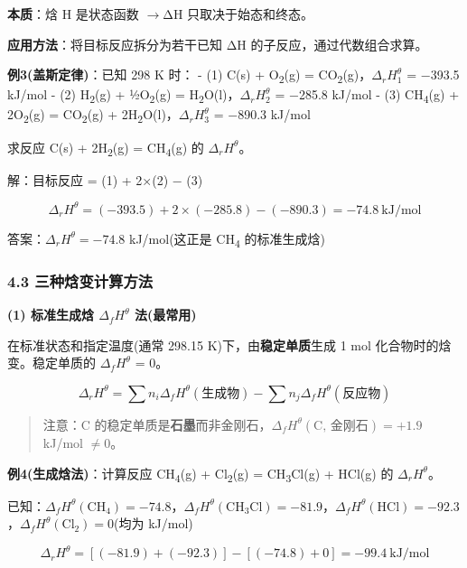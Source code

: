 \documentclass[a4paper,11pt]{ctexart}
\newcommand{\箭}{\ensuremath{\rightarrow}}
\newcommand{\左箭}{\ensuremath{\leftarrow}}
\newcommand{\上箭}{\ensuremath{\uparrow}}
\newcommand{\下箭}{\ensuremath{\downarrow}}
\newcommand{\衡}{\ensuremath{\rightleftharpoons}}
\newcommand{\双箭}{\ensuremath{\leftrightarrow}}
\newcommand{\约等于}{\ensuremath{\approx}}
\newcommand{\小于等于}{\ensuremath{\leq}}
\newcommand{\大于等于}{\ensuremath{\geq}}
\newcommand{\不等于}{\ensuremath{\neq}}
\newcommand{\西格马}{\ensuremath{\sigma}}
\newcommand{\派}{\ensuremath{\pi}}
\begin{document}
\textbf{本质}：焓 H 是状态函数 \箭 ΔH 只取决于始态和终态。

\textbf{应用方法}：将目标反应拆分为若干已知 ΔH 的子反应，通过代数组合求算。

\textbf{例3(盖斯定律)}：已知 298 K 时：
- (1) C(s) + O\textsubscript{2}(g) = CO\textsubscript{2}(g)，\(\Delta_r H_1^\theta\) = −393.5 kJ/mol
- (2) H\textsubscript{2}(g) + ½O\textsubscript{2}(g) = H\textsubscript{2}O(l)，\(\Delta_r H_2^\theta\) = −285.8 kJ/mol
- (3) CH\textsubscript{4}(g) + 2O\textsubscript{2}(g) = CO\textsubscript{2}(g) + 2H\textsubscript{2}O(l)，\(\Delta_r H_3^\theta\) = −890.3 kJ/mol

求反应 C(s) + 2H\textsubscript{2}(g) = CH\textsubscript{4}(g) 的 \(\Delta_r H^\theta\)。

解：目标反应 = (1) + 2×(2) − (3)

\[\Delta_r H^\theta = (-393.5) + 2 \times (-285.8) - (-890.3) = -74.8\ \mathrm{kJ/mol}\]

答案：\(\Delta_r H^\theta = -74.8\) kJ/mol(这正是 CH\textsubscript{4} 的标准生成焓)

\subsubsection{4.3 三种焓变计算方法}\label{ux4e09ux79cdux7113ux53d8ux8ba1ux7b97ux65b9ux6cd5}

\textbf{(1) 标准生成焓 \(\Delta_f H^\theta\) 法(最常用)}

在标准状态和指定温度(通常 298.15 K)下，由\textbf{稳定单质}生成 1 mol 化合物时的焓变。稳定单质的 \(\Delta_f H^\theta\) = 0。

\[
\boxed{\Delta_r H^\theta = \sum n_i \Delta_f H^\theta(\text{生成物}) - \sum n_j \Delta_f H^\theta(\text{反应物})}
\]

\begin{quote}
注意：C 的稳定单质是\textbf{石墨}而非金刚石，\(\Delta_f H^\theta(\text{C, 金刚石}) = +1.9\) kJ/mol \不等于 0。
\end{quote}

\textbf{例4(生成焓法)}：计算反应 CH\textsubscript{4}(g) + Cl\textsubscript{2}(g) = CH\textsubscript{3}Cl(g) + HCl(g) 的 \(\Delta_r H^\theta\)。

已知：\(\Delta_f H^\theta(\text{CH}_4) = -74.8\)，\(\Delta_f H^\theta(\text{CH}_3\text{Cl}) = -81.9\)，\(\Delta_f H^\theta(\text{HCl}) = -92.3\)，\(\Delta_f H^\theta(\text{Cl}_2) = 0\)(均为 kJ/mol)

\[\Delta_r H^\theta = [(-81.9) + (-92.3)] - [(-74.8) + 0] = -99.4\ \mathrm{kJ/mol}\]
\end{document}
